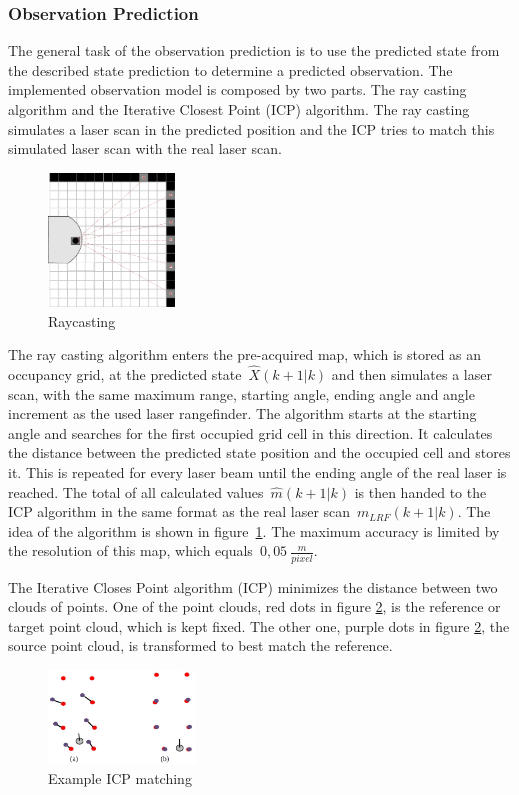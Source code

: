 \subsubsection{Observation Prediction}
\label{subsubsec:Observation_Prediction}
The general task of the observation prediction is to use the predicted state from the described state prediction to determine a predicted observation. The implemented observation model is composed by two parts. The ray casting algorithm and the Iterative Closest Point (ICP) algorithm. The ray casting simulates a laser scan in the predicted position and the ICP tries to match this simulated laser scan with the real laser scan.

\begin{figure}[h!]
\centering
\includegraphics[width=0.3\textwidth]{figures/raycast.pdf}
      \caption{Raycasting}
      \label{fig:Raycasting}
\end{figure}

The ray casting algorithm enters the pre-acquired map, which is stored as an occupancy grid, at the predicted \mbox{state $\hat{X}(k+1|k)$} and then simulates a laser scan, with the same maximum range, starting angle, ending angle and angle increment as the used laser rangefinder. The algorithm starts at the starting angle and searches for the first occupied grid cell in this direction. It calculates the distance between the predicted state position and the occupied cell and stores it. This is repeated for every laser beam until the ending angle of the real laser is reached. The total of all calculated \mbox{values $\hat{m}(k+1|k)$} is then handed to the ICP algorithm in the same format as the real laser \mbox{scan $m_{LRF}(k+1|k)$.}
The idea of the algorithm is shown in \mbox{figure \ref{fig:Raycasting}}. The maximum accuracy is limited by the resolution of this map, which \mbox{equals $0,05~\frac{m}{pixel}$.} \cite{Ivanjko}

The Iterative Closes Point algorithm (ICP) minimizes the distance between two clouds of points. One of the point clouds, red dots in figure \ref{fig:ICP_matching}, is the reference or target point cloud, which is kept fixed. The other one, purple dots in figure \ref{fig:ICP_matching}, the source point cloud, is transformed to best match the reference. \cite{Maneewarn}
\begin{figure}[h!]
\centering
\includegraphics[width=0.35\textwidth]{figures/ICP}
      \caption{Example ICP matching}
      \label{fig:ICP_matching}
\end{figure}

